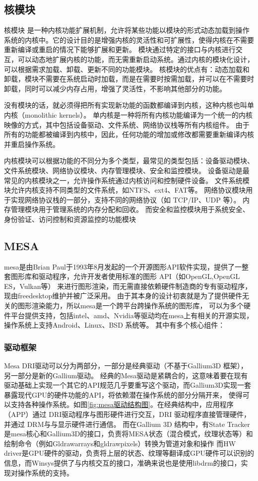 \subsection{核模块}
核模块 是一种内核功能扩展机制，允许将某些功能以模块的形式动态加载到操作系统的内核中。它的设计目的是增强内核的灵活性和可扩展性，使得内核在不需要重新编译或重启的情况下能够扩展和更新。
模块通过特定的接口与内核进行交互，可以动态地扩展内核的功能，而无需重新启动系统。通过内核的模块化设计，可以根据需求加载、卸载、更新不同的功能模块。
核模块的优点有：动态加载和卸载，模块不需要在系统启动时加载，而是在需要时按需加载，并可以在不需要时卸载，同时可以减少内存占用，增强了灵活性，不影响其他部分的功能。

没有模块的话，就必须得把所有实现新功能的函数都编译到内核，这种内核也叫单内核（monolithic kernels）。
单内核是一种将所有内核功能编译为一个统一的内核映像的方式，其中包括设备驱动、文件系统、网络协议栈等所有内核组件。
由于所有的功能都被编译到内核中，因此，任何功能的增加或修改都需要重新编译内核并重启操作系统。

内核模块可以根据功能的不同分为多个类型，最常见的类型包括：设备驱动模块、文件系统模块、网络协议模块、内存管理模块、安全和监控模块。
设备驱动是最常见的内核模块之一，允许操作系统通过内核访问和控制硬件设备。
文件系统模块允许内核支持不同类型的文件系统，如NTFS、ext4、FAT等。
网络协议模块用于实现网络协议栈的一部分，支持不同的网络协议（如 TCP/IP、UDP 等）。
内存管理模块用于管理系统的内存分配和回收。
而安全和监控模块用于系统安全、身份验证、访问控制和资源监控的功能模块

\subsection{MESA}
mesa\cite{mesa3d}是由Brian Paul于1993年8月发起的一个开源图形API软件实现，提供了一整套图形库和驱动程序，允许开发者使用标准的图形 API（如OpenGL,OpenGL ES，Vulkan等）
来进行图形渲染，而无需直接依赖硬件制造商的专有驱动程序，现由freedesktop维护并被广泛采用。
由于其本身的设计初衷就是为了提供硬件无关的图形渲染能力，所以mesa是一个跨平台跨操作系统的图形库，
可以为多个硬件平台提供支持，包括intel、amd、Nvidia等驱动均在mesa上有相关的开源实现，操作系统上支持Android、Linux、BSD 系统等。
其中有多个核心组件：

\subsubsection{驱动框架}
Mesa DRI驱动可以分为两部分，一部分是经典驱动（不基于Gallium3D 框架），另一部分是新的Gallium驱动。
经典的Mesa驱动是紧耦合的，这意味着要在现有驱动基础上实现一个其它的API规范几乎要重写这个驱动，而Gallium3D实现一套暴露现代GPU的硬件功能的API，将依赖潜在操作系统的部分分隔开来，
使得可以支持各种操作系统。如图\ref{fig:mesa驱动结构图}。在经典结构中，应用程序（APP）通过 DRI驱动程序与图形硬件进行交互，DRI 驱动程序直接管理硬件，并通过 DRM与与显示硬件进行通信。
而在Gallium 3D 结构中，有State Tracker是mesa核心和Gallium3D的接口，负责将MESA状态（混合模式，纹理状态等）和绘制命令（例如Gldrawarrays和gldrawpixels）转换为管道对象和操作
而HW driver是GPU硬件的驱动，负责将上层的状态、纹理等翻译成GPU硬件可以识别的信息，而Winsys提供了与内核交互的接口，准确来说也是使用libdrm的接口，实现对操作系统的支持。

